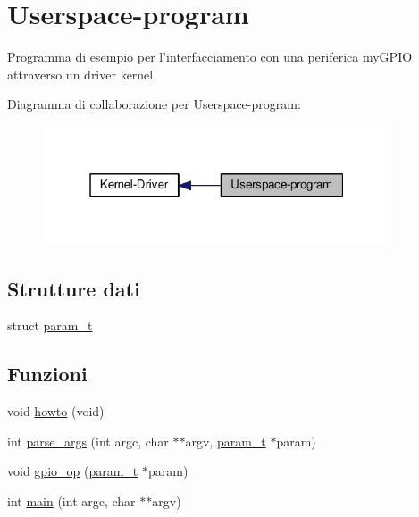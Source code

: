 \hypertarget{group___userspace-program}{\section{Userspace-\/program}
\label{group___userspace-program}
}


Programma di esempio per l'interfacciamento con una periferica my\+G\+P\+I\+O attraverso un driver kernel.  


Diagramma di collaborazione per Userspace-\/program\+:\nopagebreak
\begin{figure}[H]
\begin{center}
\leavevmode
\includegraphics[width=292pt]{group___userspace-program}
\end{center}
\end{figure}
\subsection*{Strutture dati}
\begin{DoxyCompactItemize}
\item 
struct \hyperlink{structparam__t}{param\+\_\+t}
\end{DoxyCompactItemize}
\subsection*{Funzioni}
\begin{DoxyCompactItemize}
\item 
void \hyperlink{group___userspace-program_ga05909651fa170a63e98e3f8e13451b7b}{howto} (void)
\item 
int \hyperlink{group___userspace-program_ga65d977fb03a14dedd76e1515d6d24ff4}{parse\+\_\+args} (int argc, char $\ast$$\ast$argv, \hyperlink{structparam__t}{param\+\_\+t} $\ast$param)
\item 
void \hyperlink{group___userspace-program_ga63fab82d87963c07f9557a5f5d5d3e86}{gpio\+\_\+op} (\hyperlink{structparam__t}{param\+\_\+t} $\ast$param)
\item 
int \hyperlink{group___userspace-program_ga3c04138a5bfe5d72780bb7e82a18e627}{main} (int argc, char $\ast$$\ast$argv)
\end{DoxyCompactItemize}


